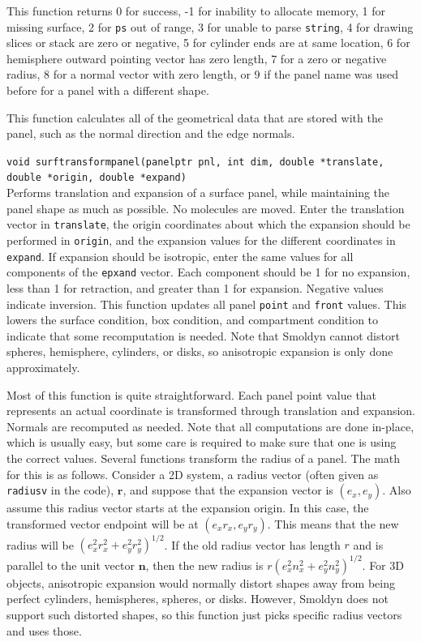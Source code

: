 \documentclass {scrbook}
\newcommand {\ttt} {\texttt}
\begin{document}
\begin{description}
This function returns 0 for success, -1 for inability to allocate memory, 1 for missing surface, 2 for \ttt{ps} out of range, 3 for unable to parse \ttt{string}, 4 for drawing slices or stack are zero or negative, 5 for cylinder ends are at same location, 6 for hemisphere outward pointing vector has zero length, 7 for a zero or negative radius, 8 for a normal vector with zero length, or 9 if the panel name was used before for a panel with a different shape.

This function calculates all of the geometrical data that are stored with the panel, such as the normal direction and the edge normals.

\item[\ttt{int}]
\ttt{void surftransformpanel(panelptr pnl, int dim, double *translate, double *origin, double *expand)}
\hfill \\
Performs translation and expansion of a surface panel, while maintaining the panel shape as much as possible. No molecules are moved. Enter the translation vector in \ttt{translate}, the origin coordinates about which the expansion should be performed in \ttt{origin}, and the expansion values for the different coordinates in \ttt{expand}. If expansion should be isotropic, enter the same values for all components of the \ttt{epxand} vector. Each component should be 1 for no expansion, less than 1 for retraction, and greater than 1 for expansion. Negative values indicate inversion. This function updates all panel \ttt{point} and \ttt{front} values. This lowers the surface condition, box condition, and compartment condition to indicate that some recomputation is needed. Note that Smoldyn cannot distort spheres, hemisphere, cylinders, or disks, so anisotropic expansion is only done approximately.

Most of this function is quite straightforward. Each panel point value that represents an actual coordinate is transformed through translation and expansion. Normals are recomputed as needed. Note that all computations are done in-place, which is usually easy, but some care is required to make sure that one is using the correct values. Several functions transform the radius of a panel. The math for this is as follows. Consider a 2D system, a radius vector (often given as \ttt{radiusv} in the code), $\bm{r}$, and suppose that the expansion vector is $(e_x, e_y)$. Also assume this radius vector starts at the expansion origin. In this case, the transformed vector endpoint will be at $(e_x r_x, e_y r_y)$. This means that the new radius will be $(e_x^2r_x^2+e_y^2r_y^2)^{1/2}$. If the old radius vector has length $r$ and is parallel to the unit vector $\bm{n}$, then the new radius is $r(e_x^2n_x^2+e_y^2n_y^2)^{1/2}$. For 3D objects, anisotropic expansion would normally distort shapes away from being perfect cylinders, hemispheres, spheres, or disks. However, Smoldyn does not support such distorted shapes, so this function just picks specific radius vectors and uses those.


\end{description}
\end{document}
